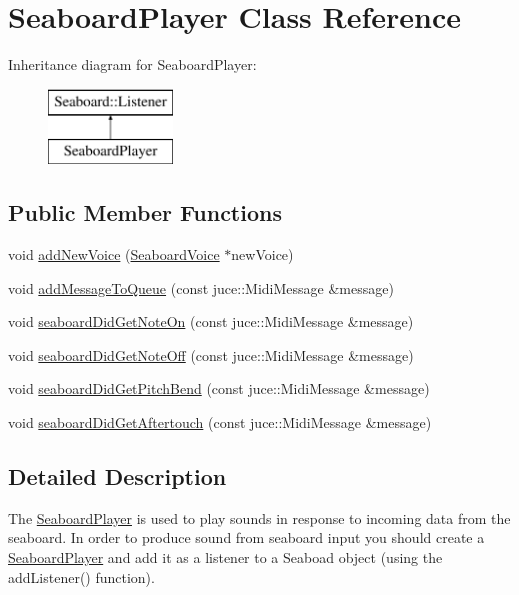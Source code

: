\hypertarget{class_seaboard_player}{\section{Seaboard\-Player Class Reference}
\label{class_seaboard_player}
}
Inheritance diagram for Seaboard\-Player\-:\begin{figure}[H]
\begin{center}
\leavevmode
\includegraphics[height=2.000000cm]{class_seaboard_player}
\end{center}
\end{figure}
\subsection*{Public Member Functions}
\begin{DoxyCompactItemize}
\item 
void \hyperlink{class_seaboard_player_a1aba40c2857902dd8791b178d6789a37}{add\-New\-Voice} (\hyperlink{struct_seaboard_voice}{Seaboard\-Voice} $\ast$new\-Voice)
\item 
void \hyperlink{class_seaboard_player_a3ff4a96e05fcfd68875912e6ff767895}{add\-Message\-To\-Queue} (const juce\-::\-Midi\-Message \&message)
\item 
void \hyperlink{class_seaboard_player_a89fca5da52c1fc92f23b700d3911c5e1}{seaboard\-Did\-Get\-Note\-On} (const juce\-::\-Midi\-Message \&message)
\item 
void \hyperlink{class_seaboard_player_a75c19846bba8e3a90c469cd82f9cc8a9}{seaboard\-Did\-Get\-Note\-Off} (const juce\-::\-Midi\-Message \&message)
\item 
void \hyperlink{class_seaboard_player_aaaf64d0212d0f5ca8dd96f3c0cb9797d}{seaboard\-Did\-Get\-Pitch\-Bend} (const juce\-::\-Midi\-Message \&message)
\item 
void \hyperlink{class_seaboard_player_a38806fb083fff421268d8f61dbfbb211}{seaboard\-Did\-Get\-Aftertouch} (const juce\-::\-Midi\-Message \&message)
\end{DoxyCompactItemize}


\subsection{Detailed Description}
The \hyperlink{class_seaboard_player}{Seaboard\-Player} is used to play sounds in response to incoming data from the seaboard. In order to produce sound from seaboard input you should create a \hyperlink{class_seaboard_player}{Seaboard\-Player} and add it as a listener to a Seaboad object (using the add\-Listener() function).

